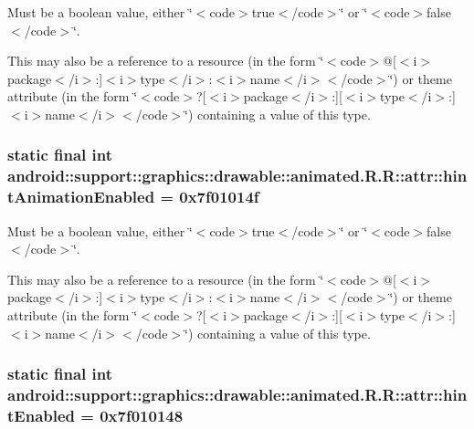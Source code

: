 Must be a boolean value, either \char`\"{}$<$code$>$true$<$/code$>$\char`\"{} or \char`\"{}$<$code$>$false$<$/code$>$\char`\"{}. 

This may also be a reference to a resource (in the form \char`\"{}$<$code$>$@\mbox{[}$<$i$>$package$<$/i$>$:\mbox{]}$<$i$>$type$<$/i$>$:$<$i$>$name$<$/i$>$$<$/code$>$\char`\"{}) or theme attribute (in the form \char`\"{}$<$code$>$?\mbox{[}$<$i$>$package$<$/i$>$:\mbox{]}\mbox{[}$<$i$>$type$<$/i$>$:\mbox{]}$<$i$>$name$<$/i$>$$<$/code$>$\char`\"{}) containing a value of this type. \hypertarget{classandroid_1_1support_1_1graphics_1_1drawable_1_1animated_1_1_r_1_1attr_6a4ae12d18de8664725183599c5a4d97}{
\subsubsection[{hintAnimationEnabled}]{\setlength{\rightskip}{0pt plus 5cm}static final int android::support::graphics::drawable::animated.R.R::attr::hintAnimationEnabled = 0x7f01014f}}
\label{classandroid_1_1support_1_1graphics_1_1drawable_1_1animated_1_1_r_1_1attr_6a4ae12d18de8664725183599c5a4d97}


Must be a boolean value, either \char`\"{}$<$code$>$true$<$/code$>$\char`\"{} or \char`\"{}$<$code$>$false$<$/code$>$\char`\"{}. 

This may also be a reference to a resource (in the form \char`\"{}$<$code$>$@\mbox{[}$<$i$>$package$<$/i$>$:\mbox{]}$<$i$>$type$<$/i$>$:$<$i$>$name$<$/i$>$$<$/code$>$\char`\"{}) or theme attribute (in the form \char`\"{}$<$code$>$?\mbox{[}$<$i$>$package$<$/i$>$:\mbox{]}\mbox{[}$<$i$>$type$<$/i$>$:\mbox{]}$<$i$>$name$<$/i$>$$<$/code$>$\char`\"{}) containing a value of this type. \hypertarget{classandroid_1_1support_1_1graphics_1_1drawable_1_1animated_1_1_r_1_1attr_13f66148e01bc9f8ce621bad230da38a}{
\subsubsection[{hintEnabled}]{\setlength{\rightskip}{0pt plus 5cm}static final int android::support::graphics::drawable::animated.R.R::attr::hintEnabled = 0x7f010148}}
\label{classandroid_1_1support_1_1graphics_1_1drawable_1_1animated_1_1_r_1_1attr_13f66148e01bc9f8ce621bad230da38a}


